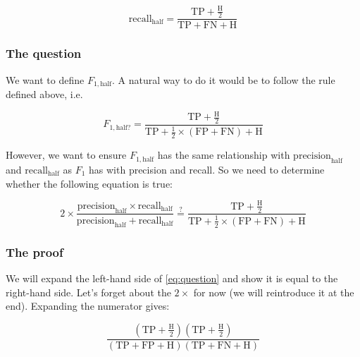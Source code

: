 \documentclass[a4paper,10pt]{article} %
\begin{document}
\begin{equation*}
    \text{recall}_{\text{half}}
        = \frac{\text{TP}+\frac{\text{H}}{2}}
            {\text{TP}+\text{FN}+\text{H}}
\end{equation*}

\subsubsection{The question}\label{sec:question}

We want to define $F_{1,\text{half}}$.
A natural way to do it would be to follow the rule defined above, i.e.

\begin{equation*}
    F_{1,\text{half?}} = \frac{\text{TP}+\frac{\text{H}}{2}}
            {\text{TP}+\frac{1}{2}\times(\text{FP}+\text{FN}) + \text{H}}
\end{equation*}

\noindent However, we want to ensure $F_{1,\text{half}}$ has the same relationship with $\text{precision}_{\text{half}}$ and $\text{recall}_{\text{half}}$ as $F_1$ has with precision and recall.
So we need to determine whether the following equation is true:

\begin{equation}\label{eq:question}
    2\times\frac{\text{precision}_{\text{half}}\times\text{recall}_{\text{half}}}
            {\text{precision}_{\text{half}} + \text{recall}_{\text{half}}}
    \stackrel{?}{=}
    \frac{\text{TP}+\frac{\text{H}}{2}}
            {\text{TP}+\frac{1}{2}\times(\text{FP}+\text{FN}) + \text{H}}
\end{equation}

\subsubsection{The proof}\label{sec:proof}

We will expand the left-hand side of \eqref{eq:question} and show it is equal to the right-hand side.
Let's forget about the $2\times$ for now (we will reintroduce it at the end).
Expanding the numerator gives:

\begin{equation*}
    \frac{\left(
        \text{TP}+\frac{\text{H}}{2}
    \right)\left(
        \text{TP}+\frac{\text{H}}{2}
    \right)}
    {\left(
        \text{TP} + \text{FP} + \text{H}
    \right)\left(
        \text{TP} + \text{FN} + \text{H}
    \right)}
\end{equation*}
\end{document}
